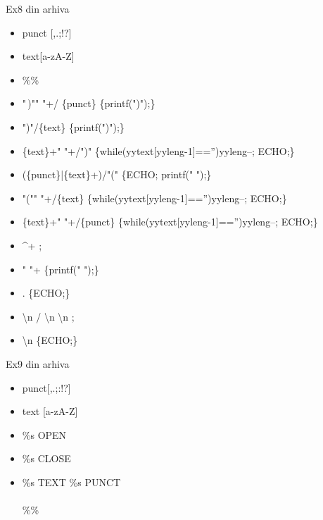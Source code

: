 \documentclass[pdf]{beamer}
\begin{document}
\begin{frame}{Ex8 din arhiva}
\begin{itemize}
\item[]
punct [,.;!?]
\item[]
text[a-zA-Z]
\item[]
\%\%
\item[]
"\,)"" "+/ \{punct\} \hspace{5mm} \{printf(")");\}
\item[]
")"/\{text\} \hspace{5mm} \{printf(")");\}
\item[]
\{text\}+" "+/")" \hspace{5mm} \{while(yytext[yyleng-1]=='')yyleng--; ECHO;\}
\item[]
(\{punct\}|\{text\}+)/"(" \hspace{5mm} \{ECHO; printf(" ");\}
\item[]
"("" "+/\{text\} \hspace{5mm} \{while(yytext[yyleng-1]=='')yyleng--; ECHO;\}
\item[]
\{text\}+" "+/\{punct\} \hspace{5mm} \{while(yytext[yyleng-1]=='')yyleng--; ECHO;\}
\item[]
\^{}+ \hspace{5mm} ;
\item[]
" "+ \hspace{5mm} \{printf(" ");\}
\item[]
. \hspace{5mm} \{ECHO;\}
\item[]
\textbackslash n / \textbackslash n \textbackslash n \hspace{5mm} ;
\item[]
\textbackslash n \hspace{5mm} \{ECHO;\}
\end{itemize}
\end{frame}



\begin{frame}{Ex9 din arhiva}
\begin{itemize}
\item[]
punct[,.;:!?]
\item[]
text [a-zA-Z]
\item[]
\%s OPEN
\item[]
\%s CLOSE
\item[]
\%s TEXT
\%s PUNCT \\~\\
\%\%
\end{itemize}
\end{frame}
\end{document}
